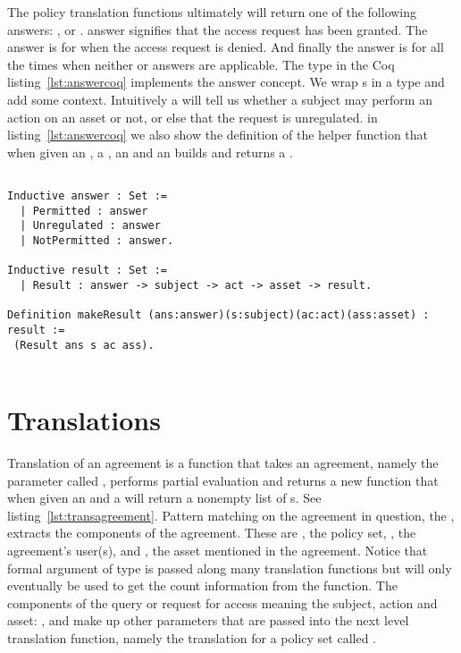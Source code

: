 The policy translation functions ultimately will return one of the following answers: ,  or .  answer signifies that the access request has been granted. The  answer is for when the access request is denied. And finally the  answer is for all the times when neither  or  answers are applicable. The  type in the Coq listing~\ref{lst:answercoq} implements the answer concept. We wrap s in a  type and add some context. Intuitively a  will tell us whether a subject may perform an action on an asset or not, or else that the request is unregulated. in listing~\ref{lst:answercoq} we also show the definition of the helper function  that when given an , a , an  and an  builds and returns a .


\begin{minipage}[c]{0.95\textwidth}
\begin{lstlisting}

Inductive answer : Set :=
  | Permitted : answer
  | Unregulated : answer
  | NotPermitted : answer.
  
Inductive result : Set :=
  | Result : answer -> subject -> act -> asset -> result.
 
Definition makeResult (ans:answer)(s:subject)(ac:act)(ass:asset) : result := 
 (Result ans s ac ass).
 
\end{lstlisting}
\end{minipage}

\section{Translations}

Translation of an agreement is a function that takes an agreement, namely the parameter called , performs partial evaluation and returns a new function that when given an  and a  will return a nonempty list of s. See listing~\ref{lst:transagreement}.
Pattern matching on the agreement in question, the , extracts the components of the agreement. These are , the policy set, , the agreement's user(s), and , the asset mentioned in the agreement. Notice that formal argument  of type  is passed along many translation functions but will only eventually be used to get the count information from the  function. The components of the query or request for access meaning the subject, action and asset: ,  and  make up other parameters that are passed into the next level translation function, namely the translation for a policy set called .


